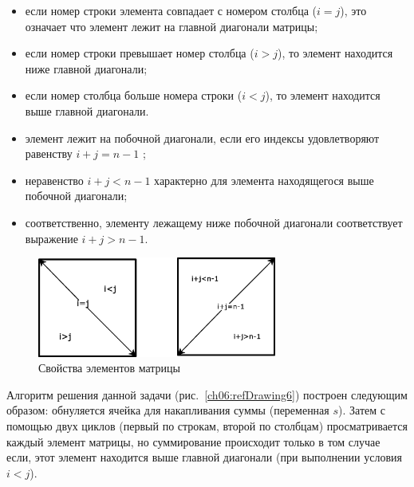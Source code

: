 \begin{itemize}
\item если номер строки элемента совпадает с номером столбца ($i=j$), это означает что элемент лежит на главной
диагонали матрицы; 
\item если номер строки превышает номер столбца ($i>j$), то элемент находится ниже главной диагонали;
\item если номер столбца больше номера строки ($i<j$), то элемент находится выше главной диагонали.
\item элемент лежит на побочной диагонали, если его индексы удовлетворяют равенству  $i+j=n-1$ ; 
\item неравенство  $i+j<n-1$  характерно для элемента находящегося выше побочной диагонали;
\item соответственно, элементу лежащему ниже побочной диагонали соответствует выражение  $i+j>n-1$.
\end{itemize}


\begin{figure}[htb]
\begin{center}
\includegraphics[width=0.7\textwidth]{img/ris_6_6}
\caption{Свойства элементов матрицы}
\label{ch06:refDrawing5}
\end{center}
\end{figure}


Алгоритм решения данной задачи (рис.~\ref{ch06:refDrawing6}) построен следующим образом: обнуляется ячейка для
накапливания суммы (переменная $s$). Затем с помощью двух циклов (первый по строкам, второй по столбцам) просматривается
каждый элемент матрицы, но суммирование происходит только в том случае если, этот элемент находится выше главной
диагонали (при выполнении условия  $i<j$).


